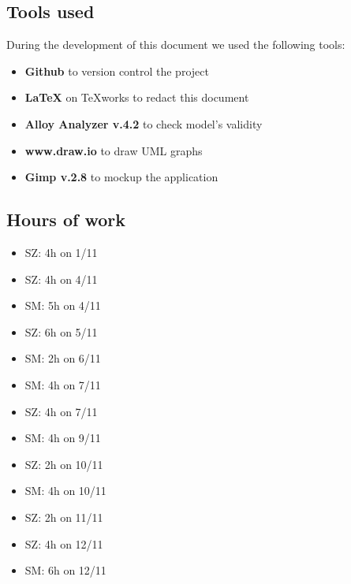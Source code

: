 \documentclass[11pt]{article} %
\begin{document}
\subsection{Tools used}
During the development of this document we used the following tools:
\begin{itemize}
	\item \textbf{Github} to version control the project
	\item \textbf{\LaTeX} on TeXworks to redact this document
	\item \textbf{Alloy Analyzer v.4.2} to check model's validity
	\item \textbf{www.draw.io} to draw UML graphs
	\item \textbf{Gimp v.2.8} to mockup the application
\end{itemize}

\subsection{Hours of work}

\begin{itemize}
	\item SZ: 4h on 1/11
	\item SZ: 4h on 4/11
	\item SM: 5h on 4/11
	\item SZ: 6h on 5/11
	\item SM: 2h on 6/11
	\item SM: 4h on 7/11
	\item SZ: 4h on 7/11
	\item SM: 4h on 9/11
	\item SZ: 2h on 10/11
	\item SM: 4h on 10/11
	\item SZ: 2h on 11/11
	\item SZ: 4h on 12/11
	\item SM: 6h on 12/11
\end{itemize}
\end{document}
